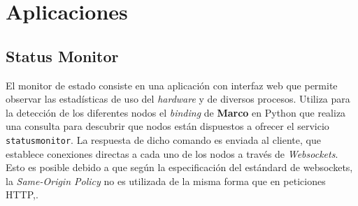 \chapter{Aplicaciones}


\section{Status Monitor}

El monitor de estado consiste en una aplicación con interfaz web que permite observar las estadísticas de uso del \textit{hardware} y de diversos procesos. Utiliza para la detección de los diferentes nodos el \textit{binding} de \textbf{Marco} en Python que realiza una consulta para descubrir que nodos están dispuestos a ofrecer el servicio \texttt{statusmonitor}. La respuesta de dicho comando es enviada al cliente, que establece conexiones directas a cada uno de los nodos a través de \textit{Websockets}\citationneeded. Esto es posible debido a que según la especificación del estándard de websockets, la \textit{Same-Origin Policy}\cite{rfc6455} no es utilizada de la misma forma que en peticiones HTTP,\cite{rfc6454}.



